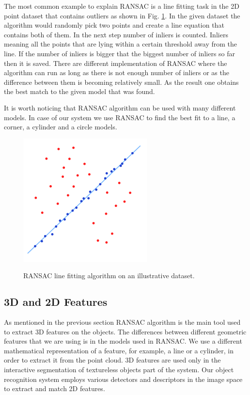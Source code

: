 The most common example to explain RANSAC is a line fitting task in the 2D point dataset that contains outliers as shown in Fig. \ref{fig:ransac}. In the given dataset the algorithm would randomly pick two points and create a line equation that contains both of them. In the next step number of inliers is counted. Inliers meaning all the points that are lying within a certain threshold away from the line. If the number of inliers is bigger that the biggest number of inliers so far then it is saved. There are different implementation of RANSAC where the algorithm can run as long as there is not enough number of inliers or as the difference between them is becoming relatively small. As the result one obtains the best match to the given model that was found.

It is worth noticing that RANSAC algorithm can be used with many different models. In case of our system we use RANSAC to find the best fit to a line, a corner, a cylinder and a circle models. 



\begin{figure}

{\includegraphics[width=0.5\columnwidth]{figures/ransac.png}}

\caption{RANSAC line fitting algorithm on an illustrative dataset.}
\label{fig:ransac}
\end{figure}



\subsection{3D and 2D Features}
As mentioned in the previous section RANSAC algorithm is the main tool used to extract 3D features on the objects. The differences between different geometric features that we are using is in the models used in RANSAC. We use a different mathematical representation of a feature, for example, a line or a cylinder, in order to extract it from the point cloud. 3D features are used only in the interactive segmentation of textureless objects part of the system. Our object recognition system employs various detectors and descriptors in the image space to extract and match 2D features.

